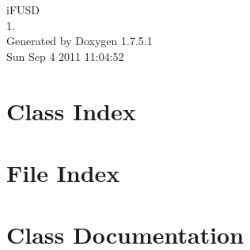 \documentclass[a4paper]{book}
\begin{document}
\hypersetup{pageanchor=false,citecolor=blue}
\begin{titlepage}
\vspace*{7cm}
\begin{center}
{\Large i\-F\-U\-S\-D \\[1ex]\large 1. }\\
\vspace*{1cm}
{\large \-Generated by Doxygen 1.7.5.1}\\
\vspace*{0.5cm}
{\small Sun Sep 4 2011 11:04:52}\\
\end{center}
\end{titlepage}
\clearemptydoublepage
{}
\tableofcontents
\clearemptydoublepage
{}
\hypersetup{pageanchor=true,citecolor=blue}
\chapter{\-Class \-Index}

\chapter{\-File \-Index}

\chapter{\-Class \-Documentation}




















\end{document}
